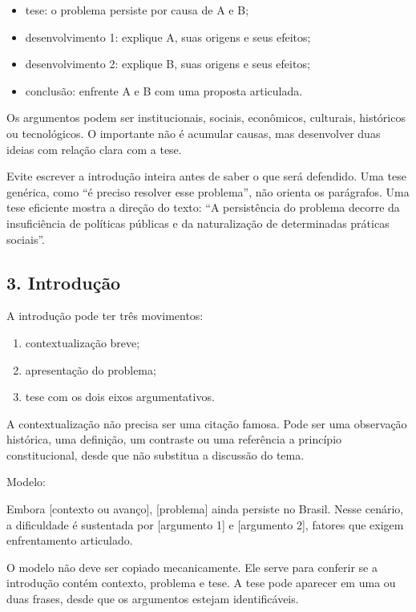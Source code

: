 \documentclass[11pt,a4paper]{article}
\begin{document}
\begin{itemize}
  \item tese: o problema persiste por causa de A e B;
  \item desenvolvimento 1: explique A, suas origens e seus efeitos;
  \item desenvolvimento 2: explique B, suas origens e seus efeitos;
  \item conclusão: enfrente A e B com uma proposta articulada.
\end{itemize}

Os argumentos podem ser institucionais, sociais, econômicos, culturais, históricos ou tecnológicos. O importante não é acumular causas, mas desenvolver duas ideias com relação clara com a tese.

Evite escrever a introdução inteira antes de saber o que será defendido. Uma tese genérica, como “é preciso resolver esse problema”, não orienta os parágrafos. Uma tese eficiente mostra a direção do texto: “A persistência do problema decorre da insuficiência de políticas públicas e da naturalização de determinadas práticas sociais”.

\subsection*{3. Introdução}

A introdução pode ter três movimentos:

\begin{enumerate}
  \item contextualização breve;
  \item apresentação do problema;
  \item tese com os dois eixos argumentativos.
\end{enumerate}

A contextualização não precisa ser uma citação famosa. Pode ser uma observação histórica, uma definição, um contraste ou uma referência a princípio constitucional, desde que não substitua a discussão do tema.

Modelo:

\begin{alerta}
Embora [contexto ou avanço], [problema] ainda persiste no Brasil. Nesse cenário, a dificuldade é sustentada por [argumento 1] e [argumento 2], fatores que exigem enfrentamento articulado.
\end{alerta}

O modelo não deve ser copiado mecanicamente. Ele serve para conferir se a introdução contém contexto, problema e tese. A tese pode aparecer em uma ou duas frases, desde que os argumentos estejam identificáveis.
\end{document}
